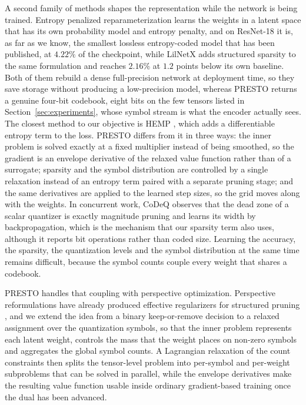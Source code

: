 \documentclass{article}
\begin{document}
A second family of methods shapes the representation while the network is being
trained. Entropy penalized reparameterization \citep{oktay2020epr} learns the
weights in a latent space that has its own probability model and entropy penalty,
and on ResNet-18 it is, as far as we know, the smallest lossless entropy-coded
model that has been published, at $4.22\%$ of the checkpoint, while LilNetX
\citep{girish2023lilnetx} adds structured sparsity to the same formulation and
reaches $2.16\%$ at $1.2$ points below its own baseline. Both of them rebuild a
dense full-precision network at deployment time, so they save storage without
producing a low-precision model, whereas PRESTO returns a genuine four-bit
codebook, eight bits on the few tensors listed in Section~\ref{sec:experiments},
whose symbol stream is what the encoder actually sees. The closest
method to our objective is HEMP \citep{tartaglione2021hemp}, which adds a
differentiable entropy term to the loss. PRESTO differs from it in three ways: the
inner problem is solved exactly at a fixed multiplier instead of being smoothed,
so the gradient is an envelope derivative of the relaxed value function rather
than of a surrogate; sparsity and the symbol
distribution are controlled by a single relaxation instead of an entropy term
paired with a separate pruning stage; and the same derivatives are applied to the
learned step sizes, so the grid moves along with the weights. In concurrent work,
CoDeQ \citep{wenshoj2025codeq} observes that the dead zone of a scalar quantizer
is exactly magnitude pruning and learns its width by backpropagation, which is
the mechanism that our sparsity term also uses, although it reports bit
operations rather than coded size. Learning the accuracy, the sparsity, the
quantization levels and the symbol distribution at the same time remains
difficult, because the symbol counts couple every weight that shares a codebook.

PRESTO handles that coupling with perspective optimization. Perspective
reformulations have already produced effective regularizers for structured
pruning \citep{cacciola2023deep}, and we extend the idea from a binary
keep-or-remove decision to a relaxed assignment over the quantization symbols, so
that the inner problem represents each latent weight, controls the mass that the
weight places on non-zero symbols and aggregates the global symbol counts. A
Lagrangian relaxation of the count constraints then splits the tensor-level
problem into per-symbol and per-weight subproblems that can be solved in
parallel, while the envelope derivatives make the resulting value function usable
inside ordinary gradient-based training once the dual has been advanced.
\end{document}
